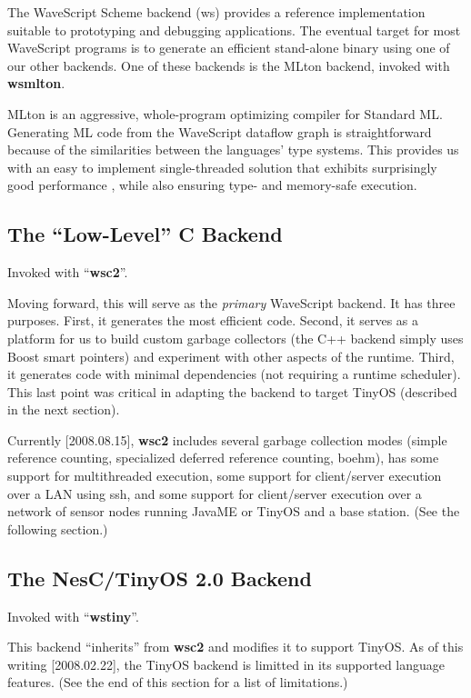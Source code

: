 \documentclass[twocolumn]{report}
\newcommand{\ws}{WaveScript}
\begin{document}
The WaveScript Scheme backend (ws) provides a reference implementation suitable
to prototyping and debugging applications.  The eventual target for
most WaveScript programs is to generate an efficient stand-alone
binary using one of our other backends.  One of these backends is the
MLton backend, invoked with {\bf wsmlton}.

MLton is an aggressive, whole-program optimizing compiler for Standard
ML.  Generating ML code from the {\ws} dataflow graph is
straightforward because of the similarities between the languages'
type systems.  This provides us with an easy to implement
single-threaded solution that exhibits surprisingly good performance
\cite{mlton}, while also ensuring type- and memory-safe
execution.  




\subsection{The ``Low-Level'' C Backend}

Invoked with ``{\bf wsc2}''.

Moving forward, this will serve as the {\em primary} WaveScript
backend.  It has three purposes.  First, it generates the most
efficient code.  Second, it serves as a platform for us to build
custom garbage collectors (the C++ backend simply uses Boost smart
pointers) and experiment with other aspects of the runtime.  Third, it
generates code with minimal dependencies (not requiring a runtime
scheduler).  This last point was critical in adapting the backend to
target TinyOS (described in the next section).

Currently [2008.08.15], {\bf wsc2} includes several garbage collection
modes (simple reference counting, specialized deferred reference
counting, boehm), has some support for multithreaded execution, some
support for client/server execution over a LAN using ssh, and some
support for client/server execution over a network of sensor nodes
running JavaME or TinyOS and a base station.  (See the following
section.)

\subsection{The NesC/TinyOS 2.0 Backend}

Invoked with ``{\bf wstiny}''.

This backend ``inherits'' from {\bf wsc2} and modifies it to support
TinyOS.  As of this writing [2008.02.22], the TinyOS backend is
limitted in its supported language features.  (See the end of this
section for a list of limitations.)
\end{document}
